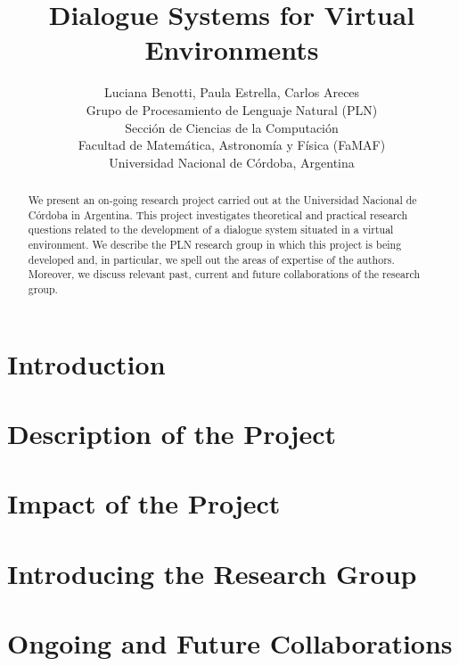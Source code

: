 \documentclass[11pt,letterpaper]{article}
\title{Dialogue Systems for Virtual Environments}
\author{Luciana Benotti, Paula Estrella, Carlos Areces \\
 Grupo de Procesamiento de Lenguaje Natural (PLN) \\
Secci\'on de Ciencias de la Computaci\'on \\
Facultad de Matem\'atica, Astronom\'ia y F\'isica (FaMAF) \\
Universidad Nacional de C\'ordoba, Argentina \\
}
\date{}
\begin{document}
\maketitle
\begin{abstract}
We present an on-going research project carried out at the Universidad Nacional de C\'ordo\-ba in Argentina. This project investigates theoretical and practical research questions related to the development of a dialogue system situated in a virtual environment. We describe the PLN research group in which this project is being developed and, in particular, we spell out the areas of expertise of the authors. Moreover, we discuss relevant past, current and future collaborations of the research group.
\end{abstract}

\section{Introduction}\label{intro}


\section{Description of the Project}\label{description}


\section{Impact of the Project}\label{impact}


\section{Introducing the Research Group}\label{group}


\section{Ongoing and Future Collaborations}\label{collaboration}




\end{document}
